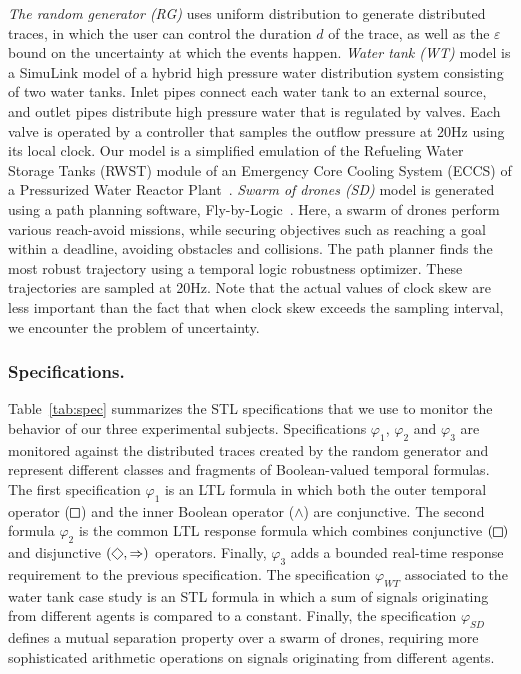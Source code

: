 \emph{The random generator (RG)} uses uniform distribution to generate distributed traces, in which the user can control the duration $d$ of the trace, as well as the $\varepsilon$ bound on the uncertainty at which the events happen.
\emph{Water tank (WT)} model is a SimuLink model of a hybrid high pressure water distribution system consisting of two water tanks. Inlet pipes connect each water tank to an external source, and outlet pipes distribute high pressure water that is regulated by valves.
Each valve is operated by a controller that samples the outflow pressure at 20Hz using its local clock. Our model is a simplified emulation of the Refueling Water Storage Tanks (RWST) module of an Emergency Core Cooling System (ECCS) of a Pressurized Water Reactor Plant~\cite{USNRCPWR}.
\emph{Swarm of drones (SD)} model is generated using a path planning software, Fly-by-Logic~\cite{PantAM17CCTA}. Here, a swarm of drones perform various reach-avoid missions, while securing objectives such as reaching a goal within a deadline, avoiding obstacles and collisions. The path planner finds the most robust trajectory using a temporal logic robustness optimizer. These trajectories are sampled at 20Hz.
\alert{Note that the actual values of clock skew are less important than the fact that when clock skew exceeds the sampling interval, we encounter the problem of uncertainty.}

\subsubsection{Specifications.}
Table~\ref{tab:spec} summarizes the STL specifications that we use to monitor the behavior of our three experimental subjects. Specifications $\varphi_{1}$, $\varphi_{2}$ and $\varphi_{3}$ are monitored against the distributed traces created by the random generator and represent different classes and fragments of Boolean-valued temporal formulas. The first specification $\varphi_1$ is an LTL formula in which both the outer temporal operator ($\LTLg$) and the inner Boolean operator ($\wedge$) are conjunctive. The second formula $\varphi_2$ is the common LTL response formula which combines conjunctive $(\LTLg)$ and disjunctive $(\LTLf, \Rightarrow)$ operators. Finally, $\varphi_3$ adds a bounded real-time response requirement to the previous specification. The specification $\varphi_{WT}$ associated to the water tank case study is an STL formula in which a sum of signals originating from different agents is compared to a constant. Finally, the specification $\varphi_{SD}$ defines a mutual separation property over a swarm of drones, requiring more sophisticated arithmetic operations on signals originating from different agents.

